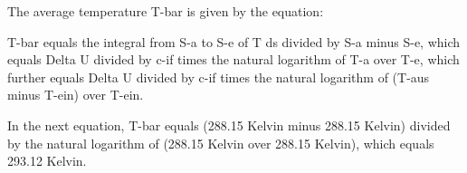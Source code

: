 The average temperature T-bar is given by the equation:

T-bar equals the integral from S-a to S-e of T ds divided by S-a minus S-e, which equals Delta U divided by c-if times the natural logarithm of T-a over T-e, which further equals Delta U divided by c-if times the natural logarithm of (T-aus minus T-ein) over T-ein.

In the next equation, T-bar equals (288.15 Kelvin minus 288.15 Kelvin) divided by the natural logarithm of (288.15 Kelvin over 288.15 Kelvin), which equals 293.12 Kelvin.